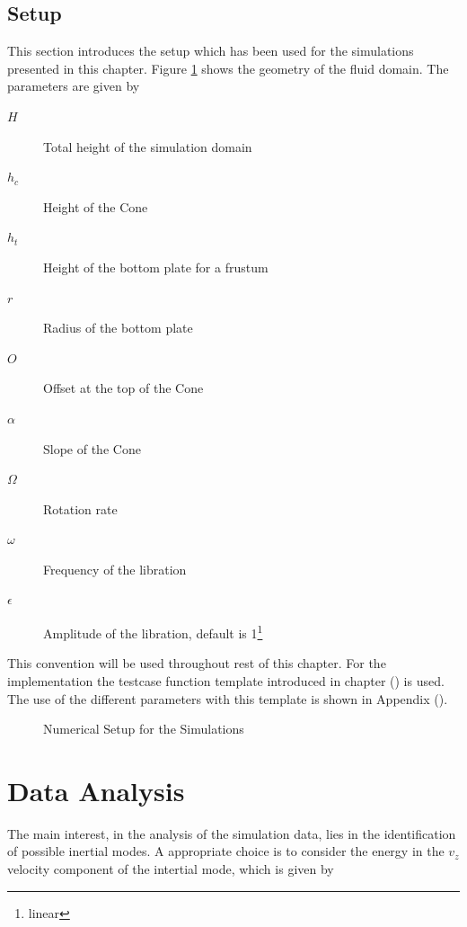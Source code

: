 \subsection{Setup}

This section introduces the setup which has been used for the simulations presented in this chapter.
Figure \ref{cone:setup_image} shows the geometry of the fluid domain. The parameters are given by

\begin{multicols}{2}
\begin{description}
    \item[$H$]{Total height of the simulation domain}
    \item[$h_c$]{Height of the Cone}
    \item[$h_t$]{Height of the bottom plate for a frustum}
    \item[$r$]{Radius of the bottom plate}
    \item[$O$]{Offset at the top of the Cone}
    \item[$\alpha$]{Slope of the Cone}
    \item[$\Omega$]{Rotation rate}
    \item[$\omega$]{Frequency of the libration}
    \item[$\epsilon$]{Amplitude of the libration, default is 1\footnote{linear}}
\end{description}
\end{multicols}

This convention will be used throughout rest of this chapter.
For the implementation the testcase function template introduced in chapter () is used.
The use of the different parameters with this template is shown in Appendix ().

\begin{figure}[!bp]
  \centering
      \caption{Numerical Setup for the Simulations \label{cone:setup_image} }
\end{figure}
\clearpage

\section{Data Analysis}

The main interest, in the analysis of the simulation data, lies in the identification of possible inertial modes.
A appropriate choice is to consider the energy in the $v_z$ velocity component of the intertial mode,
which is given by


